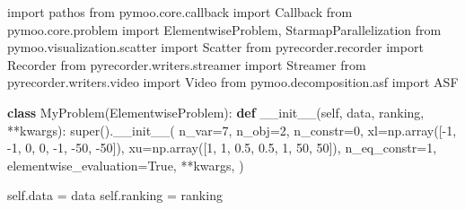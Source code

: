 \documentclass[
  authoryear,
  preprint,
  3p]{elsarticle}
\newenvironment{Shaded}{\begin{snugshade}}{\end{snugshade}}
\newcommand{\BuiltInTok}[1]{\textcolor[rgb]{0.00,0.23,0.31}{#1}}
\newcommand{\DecValTok}[1]{\textcolor[rgb]{0.68,0.00,0.00}{#1}}
\newcommand{\FloatTok}[1]{\textcolor[rgb]{0.68,0.00,0.00}{#1}}
\newcommand{\FunctionTok}[1]{\textcolor[rgb]{0.28,0.35,0.67}{#1}}
\newcommand{\ImportTok}[1]{\textcolor[rgb]{0.00,0.46,0.62}{#1}}
\newcommand{\KeywordTok}[1]{\textcolor[rgb]{0.00,0.23,0.31}{\textbf{#1}}}
\newcommand{\NormalTok}[1]{\textcolor[rgb]{0.00,0.23,0.31}{#1}}
\newcommand{\OperatorTok}[1]{\textcolor[rgb]{0.37,0.37,0.37}{#1}}
\newcommand{\VariableTok}[1]{\textcolor[rgb]{0.07,0.07,0.07}{#1}}
\begin{document}
\begin{Shaded}
\begin{Highlighting}[]
\ImportTok{import}\NormalTok{ pathos}
\ImportTok{from}\NormalTok{ pymoo.core.callback }\ImportTok{import}\NormalTok{ Callback}
\ImportTok{from}\NormalTok{ pymoo.core.problem }\ImportTok{import}\NormalTok{ ElementwiseProblem, StarmapParallelization}
\ImportTok{from}\NormalTok{ pymoo.visualization.scatter }\ImportTok{import}\NormalTok{ Scatter}
\ImportTok{from}\NormalTok{ pyrecorder.recorder }\ImportTok{import}\NormalTok{ Recorder}
\ImportTok{from}\NormalTok{ pyrecorder.writers.streamer }\ImportTok{import}\NormalTok{ Streamer}
\ImportTok{from}\NormalTok{ pyrecorder.writers.video }\ImportTok{import}\NormalTok{ Video}
\ImportTok{from}\NormalTok{ pymoo.decomposition.asf }\ImportTok{import}\NormalTok{ ASF}


\KeywordTok{class}\NormalTok{ MyProblem(ElementwiseProblem):}
    \KeywordTok{def} \FunctionTok{\_\_init\_\_}\NormalTok{(}\VariableTok{self}\NormalTok{, data, ranking, }\OperatorTok{**}\NormalTok{kwargs):}
        \BuiltInTok{super}\NormalTok{().}\FunctionTok{\_\_init\_\_}\NormalTok{(}
\NormalTok{            n\_var}\OperatorTok{=}\DecValTok{7}\NormalTok{,}
\NormalTok{            n\_obj}\OperatorTok{=}\DecValTok{2}\NormalTok{,}
\NormalTok{            n\_constr}\OperatorTok{=}\DecValTok{0}\NormalTok{,}
\NormalTok{            xl}\OperatorTok{=}\NormalTok{np.array([}\OperatorTok{{-}}\DecValTok{1}\NormalTok{, }\OperatorTok{{-}}\DecValTok{1}\NormalTok{, }\DecValTok{0}\NormalTok{, }\DecValTok{0}\NormalTok{, }\OperatorTok{{-}}\DecValTok{1}\NormalTok{, }\OperatorTok{{-}}\DecValTok{50}\NormalTok{, }\OperatorTok{{-}}\DecValTok{50}\NormalTok{]),}
\NormalTok{            xu}\OperatorTok{=}\NormalTok{np.array([}\DecValTok{1}\NormalTok{, }\DecValTok{1}\NormalTok{, }\FloatTok{0.5}\NormalTok{, }\FloatTok{0.5}\NormalTok{, }\DecValTok{1}\NormalTok{, }\DecValTok{50}\NormalTok{, }\DecValTok{50}\NormalTok{]),}
\NormalTok{            n\_eq\_constr}\OperatorTok{=}\DecValTok{1}\NormalTok{,}
\NormalTok{            elementwise\_evaluation}\OperatorTok{=}\VariableTok{True}\NormalTok{,}
            \OperatorTok{**}\NormalTok{kwargs,}
\NormalTok{        )}

        \VariableTok{self}\NormalTok{.data }\OperatorTok{=}\NormalTok{ data}
        \VariableTok{self}\NormalTok{.ranking }\OperatorTok{=}\NormalTok{ ranking}


\end{Highlighting}
\end{Shaded}
\end{document}
